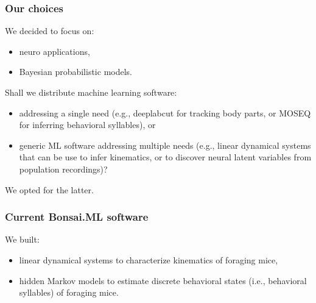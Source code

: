 \begin{frame}
    \frametitle{Our choices}

    We decided to focus on:

    \begin{itemize}

        \item neuro applications,

        \item Bayesian probabilistic models.

    \end{itemize}

     {
    Shall we distribute machine learning software:

    \begin{itemize}

        \item addressing a single need (e.g., deeplabcut for tracking body
            parts, or MOSEQ for inferring behavioral syllables), or

        \item generic ML software addressing multiple needs (e.g., linear
            dynamical systems that can be use to infer kinematics, or to
            discover neural latent variables from population recordings)?

    \end{itemize}

    We opted for the latter.
    }

\end{frame}

\begin{frame}
    \frametitle{Current Bonsai.ML software}

    We built:

    \begin{itemize}

        \item linear dynamical systems to characterize kinematics of foraging
            mice,

        \item hidden Markov models to estimate discrete behavioral states
            (i.e., behavioral syllables) of foraging mice.

    \end{itemize}


\end{frame}

